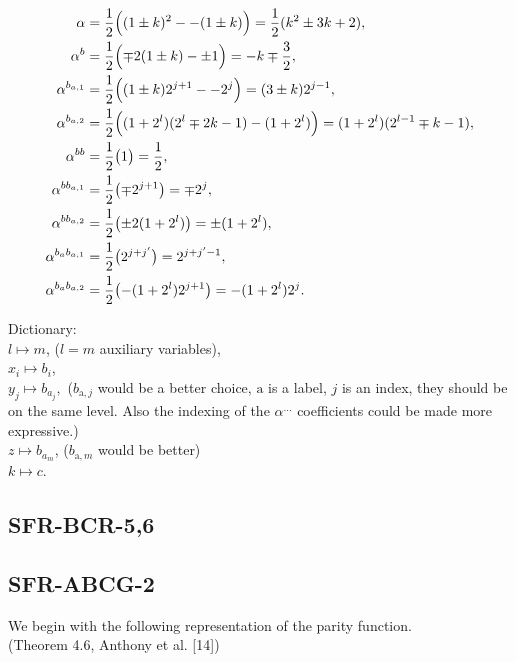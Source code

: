\documentclass[a4paper,11pt]{article}
\begin{document}
\begin{subequations}
\label{eq:BCR34alpha}
\begin{align}
\alpha &=\frac12\Bigl((1\pm k)^2--(1\pm k) \Bigr)= \frac12(k^2\pm3k+2), \\
%
\alpha^{b} &= \frac12\Bigl(\mp 2(1\pm k)-\pm1\Bigr)= -k\mp\frac32, \\
\alpha^{b_{a,1}} &= \frac12\Bigl((1\pm k)2^{j+1}--2^j\Bigr)= (3\pm k)2^{j-1}, \\
\alpha^{b_{a,2}} &= \frac12\Bigl((1+2^l)(2^l\mp2k-1)-(1+2^l)\Bigr)= (1+2^l)(2^{l-1}\mp k-1), \\
%
\alpha^{bb} &= \frac12\bigl(1\bigr)= \frac12, \\
\alpha^{bb_{a,1}} &= \frac12\bigl(\mp2^{j+1}\bigr)= \mp2^j, \\
\alpha^{bb_{a,2}} &= \frac12\bigl(\pm2(1+2^l)\bigr)= \pm(1+2^l), \\
\alpha^{b_ab_{a,1}} &= \frac12\bigl(2^{j+j'}\bigr)= 2^{j+j'-1}, \\
\alpha^{b_ab_{a,2}} &= \frac12\bigl(-(1+2^l)2^{j+1}\bigr)= -(1+2^l)2^{j}.
\end{align}
\end{subequations}

Dictionary: \\
$l\mapsto m$, ($l=m$ auxiliary variables),\\
$x_i\mapsto b_i$, \\
$y_j\mapsto b_{a_j},$
($b_{\text{a},j}$ would be a better choice, $\text{a}$ is a label, $j$ is an index, they should be on the same level.
Also the indexing of the $\alpha^{\dots}$ coefficients could be made more expressive.)\\
$z\mapsto b_{a_m}$, ($b_{\text{a},m}$ would be better)\\
$k\mapsto c$.



\subsection{SFR-BCR-5,6}


\subsection{SFR-ABCG-2}

We begin with the following representation of the parity function.
\\(Theorem 4.6, Anthony et al. [14])
\end{document}
